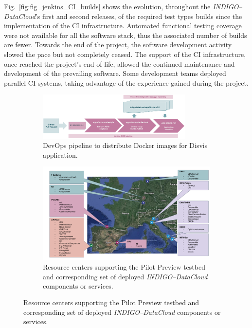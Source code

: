 Fig.~\ref{fig:fig_jenkins_CI_builds} shows the evolution, throughout the
{\sl INDIGO--DataCloud}'s first and second releases, of the required test types builds since the
implementation of the CI infrastructure. Automated functional testing coverage were not
available for all the software stack, thus the associated number of builds are fewer.
Towards the end of the project, the software development activity slowed the pace but not completely
ceased. The support of the CI infrastructure, once reached the project's end of life, allowed the
continued maintenance and development of the prevailing software. Some development teams deployed
parallel CI systems, taking advantage of the experience gained during the project.

\begin{figure}[ht]
	\centering
	\begin{subfigure}
		\centering
\includegraphics[width=0.85\textwidth]{images/disvis-flow.png}
\caption{DevOps pipeline to distribute Docker images for Disvis application.}
\label{fig:fig_disvis}
	\end{subfigure}
	\quad
	\begin{subfigure}
		\centering
\includegraphics[width=\textwidth]{images/pilotpreview.png}
\caption{Resource centers supporting the Pilot Preview testbed and corresponding
set of deployed {\sl INDIGO--DataCloud} components or services.}
\label{fig:fig_pilotpreview}
	\end{subfigure}
\end{figure}

